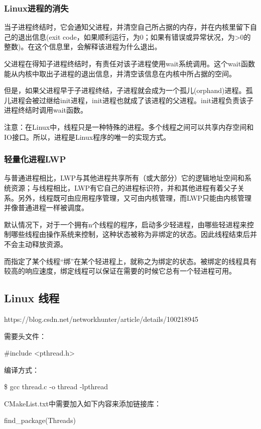 \documentclass[UTF8]{article}%
\begin{document}
\subsubsection{Linux进程的消失}

当子进程终结时，它会通知父进程，并清空自己所占据的内存，并在内核里留下自己的退出信息(exit code，如果顺利运行，为0；如果有错误或异常状况，为>0的整数)。在这个信息里，会解释该进程为什么退出。

父进程在得知子进程终结时，有责任对该子进程使用wait系统调用。这个wait函数能从内核中取出子进程的退出信息，并清空该信息在内核中所占据的空间。

但是，如果父进程早于子进程终结，子进程就会成为一个孤儿(orphand)进程。孤儿进程会被过继给init进程，init进程也就成了该进程的父进程。init进程负责该子进程终结时调用wait函数。

注意：在Linux中，线程只是一种特殊的进程。多个线程之间可以共享内存空间和IO接口。所以，进程是Linux程序的唯一的实现方式。

\subsubsection{轻量化进程LWP}

与普通进程相比，LWP与其他进程共享所有（或大部分）它的逻辑地址空间和系统资源；与线程相比，LWP有它自己的进程标识符，并和其他进程有着父子关系。另外，线程既可由应用程序管理，又可由内核管理，而LWP只能由内核管理并像普通进程一样被调度。

默认情况下，对于一个拥有n个线程的程序，启动多少轻进程，由哪些轻进程来控制哪些线程由操作系统来控制，这种状态被称为非绑定的状态。因此线程结束后并不会主动释放资源。

而指定了某个线程“绑”在某个轻进程上，就称之为绑定的状态。被绑定的线程具有较高的响应速度，绑定线程可以保证在需要的时候它总有一个轻进程可用。

\subsection{Linux 线程}

https://blog.csdn.net/networkhunter/article/details/100218945

需要头文件：

\#include <pthread.h> 

编译方式：

\$ gcc thread.c -o thread -lpthread

CMakeList.txt中需要加入如下内容来添加链接库：

find\_package(Threads)
\end{document}
